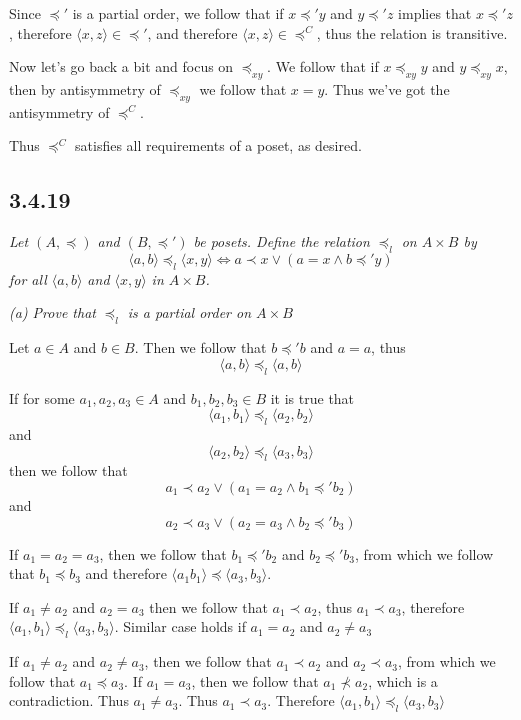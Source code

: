\documentclass[11pt,oneside,titlepage]{book}
\newcommand{\eangle}[1]{\langle #1 \rangle}
\begin{document}
Since $\preceq'$ is a partial order, we follow that if $x \preceq' y$ and $y \preceq' z$
implies that $x \preceq' z$, therefore $\eangle{x, z} \in \preceq'$, and therefore
$\eangle{x, z} \in \preceq^C$, thus the relation is transitive.

Now let's go back a bit and focus on $\preceq_{xy}$. We follow that if $x \preceq_{xy} y$
and $y \preceq_{xy} x$, then by antisymmetry of $\preceq_{xy}$ we follow that $x = y$. Thus
we've got the antisymmetry of $\preceq^C$.

Thus $\preceq^C$ satisfies all requirements of a poset, as desired.

\subsection*{3.4.19}

\textit{Let $(A, \preceq)$ and $(B, \preceq')$ be posets. Define the relation $\preceq_l$ on
  $A \times B$ by
  $$ \eangle{a, b} \preceq_l \eangle{x, y} \iff a \prec x \lor (a = x \land b \preceq' y) $$
  for all $\eangle{a, b}$ and $\eangle{x, y}$ in $A \times B$. }

\textit{(a) Prove that $\preceq_l$ is a partial order on $A \times B$}

Let $a \in A$ and $b \in B$. Then we follow that $b \preceq' b$ and $a = a$, thus
$$\eangle{a, b} \preceq_l \eangle{a, b}$$

If for some $a_1, a_2, a_3 \in A$ and $b_1, b_2, b_3 \in B$ it is true that
$$\eangle{a_1, b_1} \preceq_l \eangle{a_2, b_2}$$
and
$$ \eangle{a_2, b_2} \preceq_l \eangle{a_3, b_3} $$
then we follow that
$$a_1 \prec a_2 \lor (a_1 = a_2 \land b_1 \preceq' b_2)$$
and
$$a_2 \prec a_3 \lor (a_2 = a_3 \land b_2 \preceq' b_3)$$

If $a_1 = a_2 = a_3$, then we follow that $b_1 \preceq' b_2$ and $b_2 \preceq' b_3$, from which
we follow that $b_1 \preceq b_3$ and therefore $\eangle{a_1 b_1} \preceq \eangle{a_3, b_3}$.

If $a_1 \neq a_2$ and $a_2 = a_3$ then we follow that $a_1 \prec a_2$, thus $a_1 \prec a_3$,
therefore $\eangle{a_1, b_1} \preceq_l \eangle{a_3, b_3}$. Similar case holds if
$a_1 = a_2$ and $a_2 \neq a_3$

If $a_1 \neq a_2$ and $a_2 \neq a_3$, then we follow that $a_1 \prec a_2$ and $a_2 \prec a_3$,
from which we follow that $a_1 \preceq a_3$. If $a_1 = a_3$, then we follow that
$a_1 \not \prec a_2$, which is a contradiction. Thus $a_1 \neq a_3$. Thus $a_1 \prec a_3$.
Therefore $\eangle{a_1, b_1} \preceq_l \eangle{a_3, b_3}$
\end{document}
